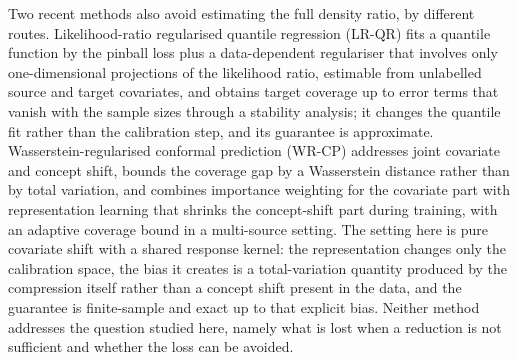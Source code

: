 \documentclass[11pt,a4paper]{article}
\theoremstyle{plain}
\theoremstyle{definition}
\theoremstyle{remark}
\begin{document}
Two recent methods also avoid estimating the full density ratio, by different routes. Likelihood-ratio regularised quantile regression (LR-QR) \cite{joshi2025} fits a quantile function by the pinball loss plus a data-dependent regulariser that involves only one-dimensional projections of the likelihood ratio, estimable from unlabelled source and target covariates, and obtains target coverage up to error terms that vanish with the sample sizes through a stability analysis; it changes the quantile fit rather than the calibration step, and its guarantee is approximate. Wasserstein-regularised conformal prediction (WR-CP) \cite{xu2025} addresses joint covariate and concept shift, bounds the coverage gap by a Wasserstein distance rather than by total variation, and combines importance weighting for the covariate part with representation learning that shrinks the concept-shift part during training, with an adaptive coverage bound in a multi-source setting. The setting here is pure covariate shift with a shared response kernel: the representation changes only the calibration space, the bias it creates is a total-variation quantity produced by the compression itself rather than a concept shift present in the data, and the guarantee is finite-sample and exact up to that explicit bias. Neither method addresses the question studied here, namely what is lost when a reduction is not sufficient and whether the loss can be avoided.
\end{document}
